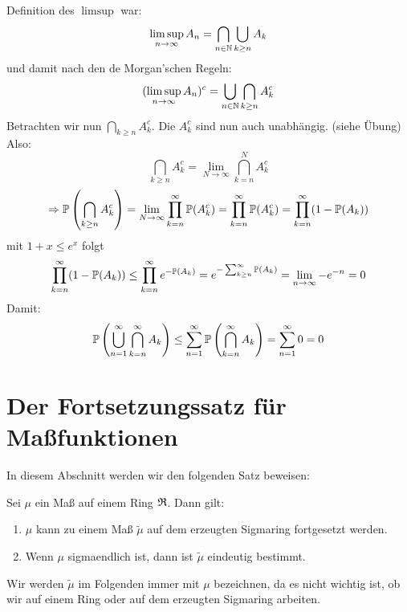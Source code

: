 			\begin{bew}
				Definition des $\limsup$ war:
				\[ \limsup_{n\to\infty} A_n=\bigcap_{n\in\N}\bigcup_{k\ge n} A_k \]
				und damit nach den de Morgan'schen Regeln:
				\[ (\limsup_{n\to\infty} A_n)^c=\bigcup_{n\in\N}\bigcap_{k\ge n} A_k^c \]
				Betrachten wir nun $\bigcap_{k\ge n} A_k^c$. Die $A_k^c$ sind nun auch unabhängig. (siehe Übung) Also:
				\[ \bigcap_{k\ge n} A_k^c = \lim_{N\to\infty} \bigcap_{k=n}^N A_k^c \]
				\[ \Rightarrow \P\left(\bigcap_{k\ge n} A_k^c\right)=\lim_{N\to\infty}\prod_{k=n}^\infty \P(A_k^c)=\prod_{k=n}^\infty \P(A_k^c)=\prod_{k=n}^\infty (1-\P(A_k)) \]
				mit $1+x\le e^x$ folgt
				\[ \prod_{k=n}^\infty (1-\P(A_k)) \le\prod_{k=n}^\infty e^{-\P(A_k)}=e^{-\sum_{k\ge n}^\infty \P(A_k)}=\lim_{n\to \infty} -e^{-n}=0 \]
				Damit:
				\[ \P\left(\bigcup_{n=1}^\infty\bigcap_{k=n}^\infty A_k\right)\le \sum_{n=1}^\infty \P\left(\bigcap_{k=n}^\infty A_k\right)=\sum_{n=1}^\infty 0=0 \]\arge
			\end{bew}
			
			\section{Der Fortsetzungssatz für Maßfunktionen}
			
			In diesem Abschnitt werden wir den folgenden Satz beweisen:
			\begin{satz}
				Sei $\mu$ ein Maß auf einem Ring $\mf{R}$. Dann gilt:
				\begin{enumerate}
					\item $\mu$ kann zu einem Maß $\widetilde{\mu}$ auf dem erzeugten Sigmaring fortgesetzt werden. 
					\item Wenn $\mu$ sigmaendlich ist, dann ist $\widetilde{\mu}$ eindeutig bestimmt. 
				\end{enumerate}
				
			\end{satz}
			
			\begin{bem}
				Wir werden $\widetilde{\mu}$ im Folgenden immer mit $\mu$ bezeichnen, da es nicht wichtig ist, ob wir auf einem Ring oder auf dem erzeugten Sigmaring arbeiten. 
			\end{bem}
			
